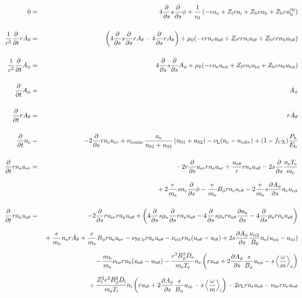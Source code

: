 \documentclass[11pt]{article}
\def\r#1{{\rm#1}}
\def\ddt{\frac{\partial}{\partial t}}
\def\dds{\frac{\partial}{\partial s}}
\def\dd#1{\frac{\partial #1}{\partial s}}
\def\ave#1{\left\langle#1\right\rangle}
\def\me{m_\r{e}}
\def\mb{m_\r{b}}
\def\mue{\mu_\r{e}}
\def\De{D_\r{e}}
\def\Di{D_\r{i}}
\def\ne{n_\r{e}}
\def\ni{n_\r{i}}
\def\nb{n_\r{b}}
\def\uer{u_{\r{e}r}}
\def\ueth{u_{\r{e}\theta}}
\def\uith{u_{\r{i}\theta}}
\def\ubth{u_{\r{b}\theta}}
\def\ueph{u_{\r{e}\phi}}
\def\uiph{u_{\r{i}\phi}}
\def\ubph{u_{\r{b}\phi}}
\def\Bth{B_\theta}
\def\Bph{B_\phi}
\def\Athd{\dot{A}_\theta}
\def\Aphd{\dot{A}_\phi}
\def\Ath{A_\theta}
\def\Aph{A_\phi}
\def\Te{T_\r{e}}
\def\Ti{T_\r{i}}
\def\nna{n_{01}}
\def\nnb{n_{02}}
\def\Zi{Z_\r{i}}
\def\Zb{Z_\r{b}}
\def\Pb{P_\r{b}}
\def\Eb{E_\r{b}}
\def\nbrp{n_\r{b}^\r{rp}}
\def\fCX{f_\r{CX}}
\def\nuNCe{\nu_\r{NCe}}
\def\nune{\nu_\r{0e}}
\def\nuL{\nu_\r{L}}
\def\nuion{\nu_\r{ionize}}
\def\nediv{n_\r{ediv}}
\begin{document}
\begin{eqnarray}
%
% 
  0 &=&
%
    4 \dds s \dds \phi
%
  + \frac{1}{\epsilon_0}
%
    \left(-e \ne + \Zi e \ni + \Zb e \nb + \Zb e \nbrp \right)
\\[5mm]
%
%
  \frac{1}{c^2} \ddt r \Athd &=&
%
    \left(   4 \dds s \dds r \Ath
%
           - 4 \dds r \Ath \right)
%
  + \mu_0 (-e r \ne \ueth + \Zi e r \ni \uith + \Zb e r \nb \ubth)
\\[5mm]
%
%
  \frac{1}{c^2} \ddt \Aphd &=&
%
    4 \dds s \dds \Aph
%
  + \mu_0 (-e \ne \ueph + \Zi e \ni \uiph + \Zb e \nb \ubph)
%
\\[5mm]
%
%
  \ddt \Aph &=&
%
  \Aphd
\\[5mm]
%
%
  \ddt r \Ath &=&
%
  r \Athd
\\[5mm]
%
%
  \ddt \ne &=&
%
  - 2 \dds r \ne \uer 
%
  + \nuion\, \frac{\ne}{\nna+\nnb}\, (\nna+\nnb)
%
  - \nuL (\ne - \nediv)
%
  + (1 - \fCX) \frac{\Pb}{\Eb}
\\[5mm]
%
%
  \ddt r \ne \uer &=&
%
  - 2 r \dds \uer r \ne \uer
%
  + \frac{\ueth}{r} r \ne \ueth
%
  - 2 s \dds \frac{\ne \Te}{\me}
\nonumber\\[3mm]&&{}
%
  + 2 \frac{e}{\me} s \ne \dds \phi
%
  - \frac{e}{\me} \Bph r \ne \ueth
%
  - 2 \frac{e}{\me} s \dd{\Aph} \ne \ueph
\\[5mm]
%
%
  \ddt r \ne \ueth &=&
%
  - 2 \dds r \uer r \ne \ueth
%
  + \left(    4 \dds s \mue \dds r \ne \ueth
%
            - 4 \dds s \mue r \ueth \dd{\ne}
%
            - 4 \dds \mue r \ne \ueth \right)
\nonumber\\[2.5mm]&&{}
%
  + \frac{e}{\me} \ne r \Athd
%
  + \frac{e}{\me} \Bph r \ne \uer
%
  - \nuNCe r \ne \ueth
%
  - \nu_\r{ei1} r \ne (\ueth - \uith)
%
  + 2 s \dd{\Aph} \frac{\nu_\r{ei2}}{\Bth} \ne (\ueph - \uiph)
\nonumber\\[2.5mm]&&{}
%
  - \frac{\mb}{\me} \nu_\r{be} r \nb (\ueth - \ubth)
%
  - \frac{e^2 \Bph^2 \De}{\me\Te}\ne
    \left(r \ueth + 2\dd{\Aph}\frac{s}{\Bph}\ueph - s
     \ave{\frac{\omega}{m}}_\r{e} \right)
\nonumber\\[2.5mm]&&{}
%
   + \frac{\Zi^2 e^2 \Bph^2 \Di}{\me\Ti}\ni
    \left(r \uith + 2\dd{\Aph}\frac{s}{\Bph}\uiph - s
     \ave{\frac{\omega}{m}}_\r{i} \right)
%
  - 2 \nuL r \ne \ueth
%
  - \nune r \ne \ueth
%
%
\\[5mm]

\end{eqnarray}
\end{document}
